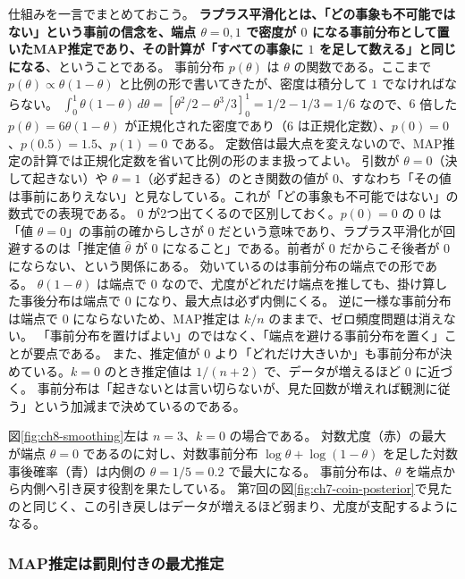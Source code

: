 仕組みを一言でまとめておこう。
\textbf{ラプラス平滑化とは、「どの事象も不可能ではない」という事前の信念を、端点 $\theta = 0, 1$ で密度が $0$ になる事前分布として置いたMAP推定であり、その計算が「すべての事象に $1$ を足して数える」と同じになる}、ということである。
事前分布 $p(\theta)$ は $\theta$ の関数である。ここまで $p(\theta) \propto \theta(1 - \theta)$ と比例の形で書いてきたが、密度は積分して $1$ でなければならない。
$\int_0^1 \theta(1 - \theta)\,d\theta = [\theta^2/2 - \theta^3/3]_0^1 = 1/2 - 1/3 = 1/6$ なので、$6$ 倍した $p(\theta) = 6\theta(1 - \theta)$ が正規化された密度であり（$6$ は正規化定数）、$p(0) = 0$、$p(0.5) = 1.5$、$p(1) = 0$ である。
定数倍は最大点を変えないので、MAP推定の計算では正規化定数を省いて比例の形のまま扱ってよい。
引数が $\theta = 0$（決して起きない）や $\theta = 1$（必ず起きる）のとき関数の値が $0$、すなわち「その値は事前にありえない」と見なしている。これが「どの事象も不可能ではない」の数式での表現である。
$0$ が2つ出てくるので区別しておく。$p(0) = 0$ の $0$ は「値 $\theta = 0$」の事前の確からしさが $0$ だという意味であり、ラプラス平滑化が回避するのは「推定値 $\hat{\theta}$ が $0$ になること」である。前者が $0$ だからこそ後者が $0$ にならない、という関係にある。
効いているのは事前分布の端点での形である。
$\theta(1 - \theta)$ は端点で $0$ なので、尤度がどれだけ端点を推しても、掛け算した事後分布は端点で $0$ になり、最大点は必ず内側にくる。
逆に一様な事前分布は端点で $0$ にならないため、MAP推定は $k/n$ のままで、ゼロ頻度問題は消えない。
「事前分布を置けばよい」のではなく、「端点を避ける事前分布を置く」ことが要点である。
また、推定値が $0$ より「どれだけ大きいか」も事前分布が決めている。$k = 0$ のとき推定値は $1/(n + 2)$ で、データが増えるほど $0$ に近づく。
事前分布は「起きないとは言い切らないが、見た回数が増えれば観測に従う」という加減まで決めているのである。

図\ref{fig:ch8-smoothing}左は $n = 3$、$k = 0$ の場合である。
対数尤度（赤）の最大が端点 $\theta = 0$ であるのに対し、対数事前分布 $\log\theta + \log(1 - \theta)$ を足した対数事後確率（青）は内側の $\theta = 1/5 = 0.2$ で最大になる。
事前分布は、$\theta$ を端点から内側へ引き戻す役割を果たしている。
第7回の図\ref{fig:ch7-coin-posterior}で見たのと同じく、この引き戻しはデータが増えるほど弱まり、尤度が支配するようになる。

\subsubsection{MAP推定は罰則付きの最尤推定}

